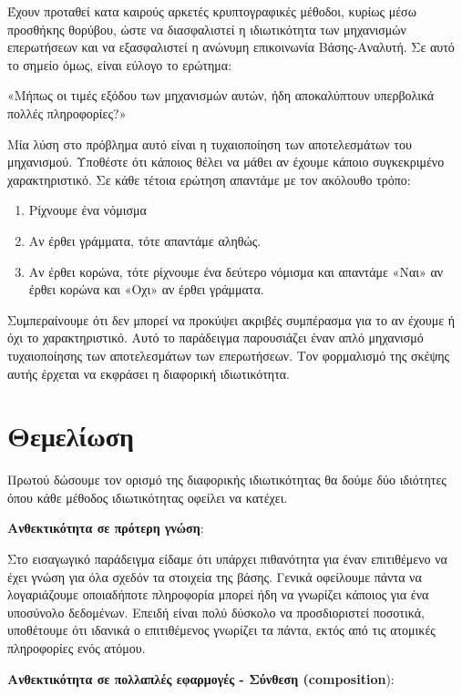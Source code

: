 Έχουν προταθεί κατα καιρούς αρκετές κρυπτογραφικές μέθοδοι, κυρίως μέσω προσθήκης θορύβου, ώστε να διασφαλιστεί η ιδιωτικότητα των μηχανισμών επερωτήσεων και να εξασφαλιστεί η ανώνυμη επικοινωνία Βάσης-Αναλυτή. Σε αυτό το σημείο όμως, είναι εύλογο το ερώτημα:

«Μήπως οι τιμές εξόδου των μηχανισμών αυτών, ήδη αποκαλύπτουν υπερβολικά πολλές πληροφορίες?» 



Μία λύση στο πρόβλημα αυτό είναι η τυχαιοποίηση των αποτελεσμάτων του μηχανισμού.
Υποθέστε ότι κάποιος θέλει να μάθει αν έχουμε  κάποιο συγκεκριμένο χαρακτηριστικό. Σε κάθε τέτοια ερώτηση απαντάμε με τον ακόλουθο τρόπο:

\begin{enumerate}
    \item Ρίχνουμε ένα νόμισμα
    \item Αν έρθει γράμματα, τότε απαντάμε αληθώς.
    \item Αν έρθει κορώνα, τότε ρίχνουμε ένα δεύτερο νόμισμα και απαντάμε «Ναι» αν έρθει κορώνα και «Οχι» αν έρθει γράμματα.
\end{enumerate}

Συμπεραίνουμε ότι δεν μπορεί να προκύψει ακριβές συμπέρασμα για το αν έχουμε ή όχι το χαρακτηριστικό. Αυτό το παράδειγμα παρουσιάζει έναν απλό μηχανισμό τυχαιοποίησης των αποτελεσμάτων των επερωτήσεων. Τον φορμαλισμό της σκέψης  αυτής έρχεται να εκφράσει η διαφορική ιδιωτικότητα.


\section{Θεμελίωση}

Πρωτού δώσουμε τον ορισμό της διαφορικής ιδιωτικότητας θα δούμε δύο ιδιότητες όπου κάθε μέθοδος ιδιωτικότητας οφείλει να κατέχει.

\textbf{Ανθεκτικότητα σε πρότερη γνώση}:

Στο εισαγωγικό παράδειγμα είδαμε ότι υπάρχει πιθανότητα για έναν επιτιθέμενο να έχει γνώση για όλα σχεδόν τα στοιχεία της βάσης. Γενικά οφείλουμε πάντα να λογαριάζουμε οποιαδήποτε πληροφορία μπορεί ήδη να γνωρίζει κάποιος για ένα υποσύνολο δεδομένων. Επειδή είναι πολύ δύσκολο να προσδιοριστεί ποσοτικά, υποθέτουμε ότι ιδανικά ο επιτιθέμενος γνωρίζει τα πάντα, εκτός από τις ατομικές πληροφορίες ενός ατόμου.



\textbf{Ανθεκτικότητα σε πολλαπλές εφαρμογές - Σύνθεση (\textlatin{composition}}):

